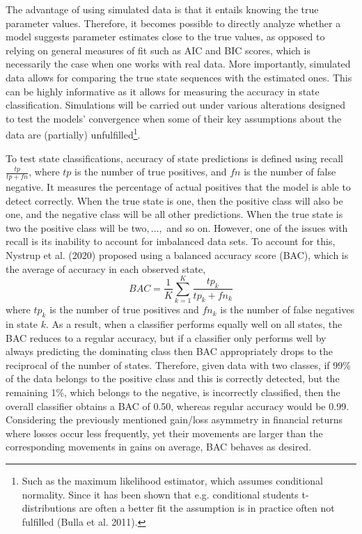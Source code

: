 The advantage of using simulated data is that it entails knowing the true parameter values. Therefore, it becomes possible to directly analyze whether a model suggests parameter estimates close to the true values, as opposed to relying on general measures of fit such as AIC and BIC scores, which is necessarily the case when one works with real data. More importantly, simulated data allows for comparing the true state sequences with the estimated ones. This can be highly informative as it allows for measuring the accuracy in state classification. Simulations will be carried out under various alterations designed to test the models' convergence when some of their key assumptions about the data are (partially) unfulfilled\footnote
{Such as the maximum likelihood estimator, which assumes conditional normality. Since it has been shown that e.g. conditional students t-distributions are often a better fit the assumption is in practice often not fulfilled (Bulla et al. 2011).
}.

To test state classifications, accuracy of state predictions is defined using recall $\frac{tp}{tp+fn}$, where $tp$ is the number of true positives, and $fn$ is the number of false negative. It measures the percentage of actual positives that the model is able to detect correctly. When the true state is one, then the positive class will also be one, and the negative class will be all other predictions. When the true state is two the positive class will be two$,\ldots,$ and so on. However, one of the issues with recall is its inability to account for imbalanced data sets. To account for this, Nystrup et al. (2020) proposed using a balanced accuracy score (BAC), which is the average of accuracy in each observed state,
\begin{equation}
    BAC = \frac{1}{K} \sum_{k=1}^K \frac{tp_k}{tp_k + fn_k}
    \label{eq: BAC definition}
\end{equation}
where $tp_k$ is the number of true positives and $fn_k$ is the number of false negatives in state $k$. As a result, when a classifier performs equally well on all states, the BAC reduces to a regular accuracy, but if a classifier only performs well by always predicting the dominating class then BAC appropriately drops to the reciprocal of the number of states. Therefore, given data with two classes, if 99\% of the data belongs to the positive class and this is correctly detected, but the remaining 1\%, which belongs to the negative, is incorrectly classified, then the overall classifier obtains a BAC of 0.50, whereas regular accuracy would be 0.99. Considering the previously mentioned gain/loss asymmetry in financial returns where losses occur less frequently, yet their movements are larger than the corresponding movements in gains on average, BAC behaves as desired.

